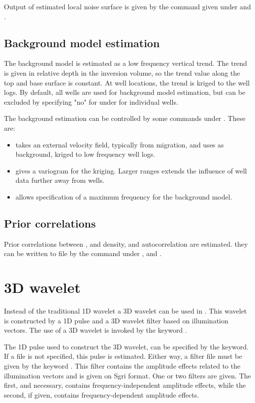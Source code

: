 Output of estimated local noise surface is given by the command
 given under  and . 

\subsection{Background model estimation}
The background model is estimated as a low frequency vertical
trend. The trend is given in relative depth in the inversion volume,
so the trend value along the top and base surface is constant. At
well locations, the trend is kriged to the well logs. By default, all
wells are used for background model estimation, but can be excluded by 
specifying "no" for  under  for individual
wells. 

The background estimation can be controlled by some commands under
. These are: 
\begin{itemize}
\item {} takes an external velocity field, typically
  from migration, and uses as \vp background, kriged to low frequency
  \vp well logs. 
\item {} gives a variogram for the
  kriging. Larger ranges extends the influence of well data further
  away from wells. 
\item {} allows specification of a maximum frequency for
  the background model. 
\end{itemize}

\subsection{Prior correlations}
Prior correlations between \vp, \vs and density, and autocorrelation are estimated. they can be written to file by the command  under ,  and .

\section{3D wavelet}
Instead of the traditional 1D wavelet a 3D wavelet can be used in
\crava. This wavelet is constructed by a 1D pulse and a 3D wavelet
filter based on illumination vectors. The use of a 3D wavelet is
invoked by the keyword .  

The 1D pulse used to construct the 3D wavelet, can be specified by the
 keyword. If a file is not specified, this pulse is
estimated. Either way, a filter file must be given by the keyword
. This filter contains the amplitude
effects related to the illumination vectors and is given on Sgri
format. One or two filters are given. The first, and necessary,
contains frequency-independent amplitude effects, while the second, if
given, contains frequency-dependent amplitude effects. 

